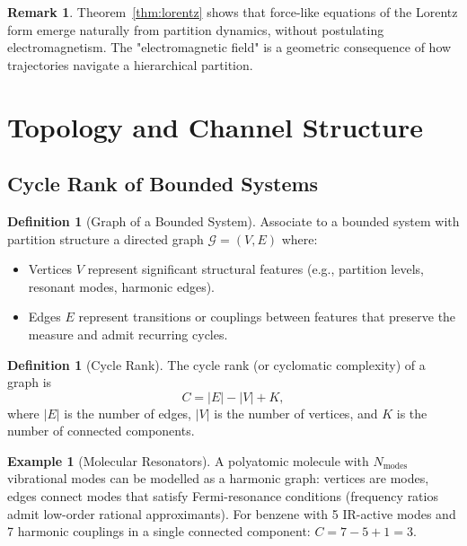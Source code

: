 \documentclass[11pt,twocolumn,a4paper]{article}
\theoremstyle{definition}
\newtheorem{definition}[theorem]{Definition}
\newtheorem{remark}[theorem]{Remark}
\newtheorem{example}[theorem]{Example}
\newcommand{\calG}{\mathcal{G}}
\begin{document}
\begin{remark}
Theorem~\ref{thm:lorentz} shows that force-like equations of the Lorentz form emerge naturally from partition dynamics, without postulating electromagnetism. The "electromagnetic field" is a geometric consequence of how trajectories navigate a hierarchical partition.
\end{remark}

\section{Topology and Channel Structure}
\label{sec:topology}

\subsection{Cycle Rank of Bounded Systems}

\begin{definition}[Graph of a Bounded System]
Associate to a bounded system with partition structure a directed graph $\calG = (V, E)$ where:
\begin{itemize}[nosep]
\item Vertices $V$ represent significant structural features (e.g., partition levels, resonant modes, harmonic edges).
\item Edges $E$ represent transitions or couplings between features that preserve the measure and admit recurring cycles.
\end{itemize}
\end{definition}

\begin{definition}[Cycle Rank]
The cycle rank (or cyclomatic complexity) of a graph is
\[
C = |E| - |V| + K,
\]
where $|E|$ is the number of edges, $|V|$ is the number of vertices, and $K$ is the number of connected components.
\]
\end{definition}

\begin{example}[Molecular Resonators]
A polyatomic molecule with $N_{\text{modes}}$ vibrational modes can be modelled as a harmonic graph: vertices are modes, edges connect modes that satisfy Fermi-resonance conditions (frequency ratios admit low-order rational approximants). For benzene with 5 IR-active modes and 7 harmonic couplings in a single connected component: $C = 7 - 5 + 1 = 3$.
\end{example}
\end{document}
